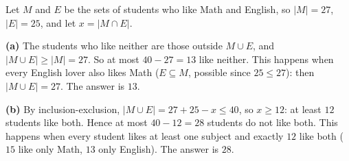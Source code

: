 Let $M$ and $E$ be the sets of students who like Math and English, so $|M|=27$, $|E|=25$, and let $x=|M\cap E|$.

\textbf{(a)} The students who like neither are those outside $M\cup E$, and $|M\cup E|\ge|M|=27$. So at most $40-27=13$ like neither. This happens when every English lover also likes Math ($E\subseteq M$, possible since $25\le27$): then $|M\cup E|=27$. The answer is $\boxed{13}$.

\textbf{(b)} By inclusion-exclusion, $|M\cup E|=27+25-x\le40$, so $x\ge12$: at least $12$ students like both. Hence at most $40-12=28$ students do not like both. This happens when every student likes at least one subject and exactly $12$ like both ($15$ like only Math, $13$ only English). The answer is $\boxed{28}$.
